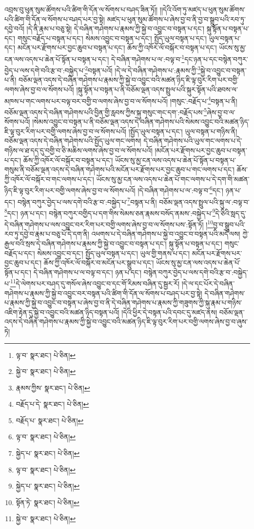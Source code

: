 འབྲས་བུ་ཕུན་སུམ་ཚོགས་པའི་ཚིག་གི་དོན་ལ་སོགས་པ་བཤད་ཟིན་ཏོ།། །།དེའི་འོག་ཏུ་མཛད་པ་ཕུན་སུམ་ཚོགས་པའི་ཚིག་གི་དོན་ལ་སོགས་པ་བཤད་པར་བྱ་སྟེ། མཛད་པ་ཕུན་སུམ་ཚོགས་པ་ཞེས་བྱ་བ་ནི་བྱ་བ་སྒྲུབ་པའི་རབ་ཏུ་དབྱེ་བའོ། །དེ་ནི་རྣམ་པ་བཅུ་སྟེ། དེ་བཞིན་གཤེགས་པ་རྣམས་ཀྱི་སྐྱེ་བ་འབྱུང་བ་བསྟན་པ་དང་། སྐུ་སྟོན་པ་བསྟན་པ་དང་། གསུང་བརྗོད་པ་བསྟན་པ་དང་། སེམས་འབྱུང་བ་བསྟན་པ་དང་། སྤྱོད་ཡུལ་བསྟན་པ་དང་། ཡུལ་བསྟན་པ་དང་། མངོན་པར་རྫོགས་པར་བྱང་ཆུབ་པ་བསྟན་པ་དང་། ཆོས་ཀྱི་འཁོར་ལོ་བསྐོར་བ་བསྟན་པ་དང་། ཡོངས་སུ་མྱ་ངན་ལས་འདས་པ་ཆེན་པོ་སྟོན་པ་བསྟན་པ་དང་། དེ་བཞིན་གཤེགས་པ་ལ་:བལྟ་བ་\footnote{ལྟ་བ་  སྣར་ཐང་།  པེ་ཅིན། }དང་ཉན་པ་དང་བསྙེན་བཀུར་བྱེད་པ་ལས་དགེ་བའི་རྩ་བ་:བསྐྱེད་པ་\footnote{སྐྱེ་བ་  སྣར་ཐང་།  པེ་ཅིན། }བསྟན་པའོ། །དེ་ལ་དེ་བཞིན་གཤེགས་པ་:རྣམས་ཀྱི་\footnote{རྣམས་ཀྱིས་  སྣར་ཐང་།  པེ་ཅིན། }སྐྱེ་བ་འབྱུང་བ་བསྟན་པ་ནི། བཅོམ་ལྡན་འདས་དེ་བཞིན་གཤེགས་པ་རྣམས་ཀྱི་སྐྱེ་བ་འབྱུང་བའི་མཚན་ཉིད་ཇི་ལྟ་བུར་རིག་པར་བགྱི་ལགས་ཞེས་བྱ་བ་ལ་སོགས་པའོ། །སྐུ་སྟོན་པ་བསྟན་པ་ནི་བཅོམ་ལྡན་འདས་སྤྲུལ་པའི་སྐུར་སྟོན་པའི་ཐབས་ལ་མཁས་པ་གང་ལགས་པར་བལྟ་བར་བགྱི་བ་ལགས་ཞེས་བྱ་བ་ལ་སོགས་པའོ། །གསུང་:བརྗོད་པ་\footnote{བརྗོད་པ་དེ་  སྣར་ཐང་།  པེ་ཅིན། }བསྟན་པ་ནི། བཅོམ་ལྡན་འདས་དེ་བཞིན་གཤེགས་པའི་བྱིན་གྱི་རླབས་ཀྱིས་སྐུ་གསུང་གང་དག་:བརྗོད་པས་\footnote{བརྗོད་པ་  སྣར་ཐང་།  པེ་ཅིན། }ཞེས་བྱ་བ་ལ་སོགས་པའོ། །སེམས་འབྱུང་བ་བསྟན་པ་ནི་བཅོམ་ལྡན་འདས་དེ་བཞིན་གཤེགས་པའི་སེམས་འབྱུང་བའི་མཚན་ཉིད་ཇི་ལྟ་བུར་རིག་པར་བགྱི་ལགས་ཞེས་བྱ་བ་ལ་སོགས་པའོ། །སྤྱོད་ཡུལ་བསྟན་པ་དང་། ཡུལ་བསྟན་པ་གཉིས་ནི། བཅོམ་ལྡན་འདས་དེ་བཞིན་གཤེགས་པའི་སྤྱོད་ཡུལ་གང་ལགས། དེ་བཞིན་གཤེགས་པའི་ཡུལ་གང་ལགས་པ་དེ་གཉིས་ལ་ཐ་དད་དུ་བགྱི་བ་ཅི་མཆིས་ལགས་ཞེས་བྱ་བ་ལ་སོགས་པའོ། །མངོན་པར་རྫོགས་པར་བྱང་ཆུབ་པ་བསྟན་པ་དང་། ཆོས་ཀྱི་འཁོར་ལོ་བསྐོར་བ་བསྟན་པ་དང་། ཡོངས་སུ་མྱ་ངན་ལས་འདས་པ་ཆེན་པོ་སྟོན་པ་བསྟན་པ་གསུམ་ནི་བཅོམ་ལྡན་འདས་དེ་བཞིན་གཤེགས་པའི་མངོན་པར་རྫོགས་པར་བྱང་ཆུབ་པ་གང་ལགས་པ་དང་། ཆོས་ཀྱི་འཁོར་ལོ་བསྐོར་བ་གང་ལགས་པ་དང་། ཡོངས་སུ་མྱ་ངན་ལས་འདས་པ་ཆེན་པོ་གང་ལགས་པ་དེ་དག་གི་མཚན་ཉིད་ཇི་ལྟ་བུར་རིག་པར་བགྱི་ལགས་ཞེས་བྱ་བ་ལ་སོགས་པའོ། །དེ་བཞིན་གཤེགས་པ་ལ་:བལྟ་བ་\footnote{ལྟ་བ་  སྣར་ཐང་།  པེ་ཅིན། }དང་། ཉན་པ་དང་། བསྙེན་བཀུར་བྱེད་པ་ལས་དགེ་བའི་རྩ་བ་:བསྐྱེད་པ་\footnote{སྐྱེད་པ་  སྣར་ཐང་།  པེ་ཅིན། }བསྟན་པ་ནི། བཅོམ་ལྡན་འདས་སྤྲུལ་པའི་སྐུ་ལ་:བལྟ་བ་\footnote{ལྟ་བ་  སྣར་ཐང་།  པེ་ཅིན། }དང་། ཉན་པ་དང་། བསྙེན་བཀུར་བགྱིད་པ་དག་གིས་སེམས་ཅན་རྣམས་བསོད་ནམས་:བསྐྱེད་པ་\footnote{སྐྱེད་པ་  སྣར་ཐང་།  པེ་ཅིན། }དེ་ཅིའི་སླད་དུ་དེ་བཞིན་གཤེགས་པ་ལས་འབྱུང་བར་རིག་པར་བགྱི་ལགས་ཞེས་བྱ་བ་ལ་སོགས་པས་:སྟོན་ཏོ། །\footnote{སྟོན་ཏེ་  སྣར་ཐང་།  པེ་ཅིན། }བྱ་བ་སྒྲུབ་པའི་རབ་ཏུ་དབྱེ་བ་རྣམ་པ་བཅུ་པོ་དེ་དག་ནི། འཕགས་པ་དེ་བཞིན་གཤེགས་པ་སྐྱེ་བ་འབྱུང་བ་བསྟན་པའི་མདོ་ལས། ཀྱེ་རྒྱལ་བའི་སྲས་དེ་བཞིན་གཤེགས་པ་རྣམས་ཀྱི་སྐྱེ་བ་འབྱུང་བ་བསྟན་པ་དང་། སྐུ་སྟོན་པ་བསྟན་པ་དང་། གསུང་བརྗོད་པ་དང་། སེམས་འབྱུང་བ་དང་། སྤྱོད་ཡུལ་བསྟན་པ་དང་། ཡུལ་གྱི་གནས་པ་དང་། མངོན་པར་རྫོགས་པར་བྱང་ཆུབ་པ་དང་། ཆོས་ཀྱི་འཁོར་ལོ་བསྐོར་བ་མངོན་པར་སྒྲུབ་པ་དང་། ཡོངས་སུ་མྱ་ངན་ལས་འདས་པ་ཆེན་པོ་སྟོན་པ་དང་། དེ་བཞིན་གཤེགས་པ་ལ་བལྟ་བ་དང་། ཉན་པ་དང་། བསྙེན་བཀུར་བྱེད་པ་ལས་དགེ་བའི་རྩ་བ་:བསྐྱེད་པ་\footnote{སྐྱེ་བ་  སྣར་ཐང་།  པེ་ཅིན། }དེ་ལེགས་པར་བཤད་དུ་གསོལ་ཞེས་འབྱུང་བ་དང་གོ་རིམས་བཞིན་དུ་སྦྱར་རོ། །དེ་ལ་དང་པོར་དེ་བཞིན་གཤེགས་པ་རྣམས་ཀྱི་སྐྱེ་བ་འབྱུང་བར་བསྟན་པའི་ཚིག་གི་དོན་ལ་སོགས་པ་བཤད་པར་བྱ་སྟེ། དེ་བཞིན་གཤེགས་པ་རྣམས་ཀྱི་སྐྱེ་བ་འབྱུང་བ་བསྟན་པ་ཞེས་བྱ་བ་ནི་དེ་བཞིན་གཤེགས་པ་རྣམས་ཀྱི་གཟུགས་ཀྱི་སྐུ་རྣམ་པ་གཉིས་འཇིག་རྟེན་དུ་སྐྱེ་བ་འབྱུང་བའི་མཚན་ཉིད་བསྟན་པའོ། །དེའི་ཕྱིར་དེ་བསྟན་པའི་དབང་དུ་མཛད་ནས། བཅོམ་ལྡན་འདས་དེ་བཞིན་གཤེགས་པ་རྣམས་ཀྱི་སྐྱེ་བ་འབྱུང་བའི་མཚན་ཉིད་ཇི་ལྟ་བུར་རིག་པར་བགྱི་ལགས་ཞེས་བྱ་བ་ཞུས་ཏེ། 